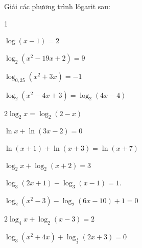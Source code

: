 \begin{vd}
	Giải các phương trình lôgarit sau:
	\begin{enumEX}[a)]{1}
		\item $\log {\left( x-1 \right) }=2$
		\item $\log_2\left(x^2-19x+2\right)=9$
		\item $\log_{0{,25}}(x^2+3x)=-1 $
		\item $\log_2 {\left(x^2-4x+3 \right)}=\log_2 {\left(4x-4 \right)}$
		\item $2\log_2x=\log_2(2-x)$ 
		\item $ \ln x+ \ln (3x-2)=0$
		\item $\ln(x+1)+\ln(x+3)=\ln(x+7)$ 
		\item $\log_2x+\log_2(x+2)=3$
		\item  $\log_3(2x+1)-\log_3(x-1)=1$.
		\item $\log_2\left(x^2 - 3\right) - \log_2(6x - 10) + 1 = 0$
		\item $2\log_{4}{x}+\log_{2}\left(x-3\right)=2$
		\item $\log_3 (x^2 + 4x) + \log_{\tfrac{1}{3}} (2x+3) = 0$ 
		

\end{enumEX}
\end{vd}
